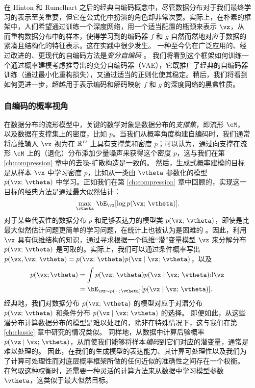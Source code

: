 \documentclass[../../book-main_zh.tex]{subfiles}
\begin{document}
在 Hinton 和 Rumelhart \cite{Rumelhart1986} 之后的经典自编码概念中，尽管数据分布对于我们最终学习的表示至关重要，但它在公式化中扮演的角色却非常次要。实际上，在朴素的框架中，人们希望通过训练一个深度网络，用一个适当配置的瓶颈来表示 $\vz$，从而重构数据分布中的样本，使得学习到的编码器 $f$ 和 $g$ 自然而然地对应于数据的紧凑且结构化的特征表示。这在实践中很少发生。
一种至今仍在广泛应用的、经过改进的、更现代的自编码方法是\textit{变分自编码} \cite{Kingma2013-sb,Kingma2019-zh}。
我们将看到这个框架如何训练一个通过概率建模考虑推导出的变分自编码器（VAE），它既推广了经典的自编码器训练（通过最小化重构损失），又通过适当的正则化使其稳定。稍后，我们将看到如何更进一步，超越用于表示编码和解码映射 $f$ 和 $g$ 的深度网络的黑盒性质。

\subsubsection{自编码的概率视角}
在数据分布的流形模型中，关键的数学对象是数据分布的\textit{支撑集}，即流形 $\cM$，以及数据在支撑集上的密度，比如 $p$。当我们从概率角度构建自编码时，我们通常将高维输入 $\vx$ 视为在 $\mathbb{R}^D$ 上具有支撑集和密度 $p$；可以认为，通过向支撑在流形 $\cM$ 上的（退化）分布添加少量噪声来获得这个密度 $p$，这与我们在第 \ref{ch:compression} 章中的去噪-扩散构造是一致的。
然后，生成式概率建模的目标是从样本 $\vx$ 中学习密度 $p$，比如从一类由 $\vtheta$ 参数化的模型 $p(\vx;\, \vtheta)$ 中学习。正如我们在第 \ref{ch:compression} 章中回顾的，实现这一目标的经典方法是通过最大似然估计：
\begin{equation*}\label{eq:VAE-MLE}
\max_{\vtheta}\, \bE_{\vx}[ \log p(\vx;\, \vtheta) ].
\end{equation*}
对于某些代表性的数据分布 $p$ %
和足够表达力的模型类 $p(\vx;\, \vtheta)$，即使是比最大似然估计问题更简单的学习问题，在统计上也被认为是困难的 \cite{Yang1999-wb}。因此，利用 $\vx$ 具有低维结构的知识，通过寻求根据一个低维“潜”变量模型 $\vz$ 来分解分布 $p(\vx ;\, \vtheta)$ 是可取的。实际上，我们可以通过条件概率写出 $p(\vx, \vz ;\, \vtheta)
= p(\vz;\, \vtheta) p(\vx \mid \vz;\, \vtheta)$，以及
\begin{align*}
p(\vx; \vtheta) &= \int p(\vz;\, \vtheta) p(\vx \mid \vz;\, \vtheta) \odif \vz
\\
&=
\bE_{\vz \sim p(\,\cdot\,;\, \vtheta)}[ p(\vx \mid \vz;\, \vtheta) ].
\end{align*}
经典地，我们对数据分布 $p(\vx;\, \vtheta)$ 的模型对应于对潜分布 $p(\vz;\, \vtheta)$ 和条件分布 $p(\vx \mid \vz;\, \vtheta)$ 的选择。
即便如此，从这些潜分布计算数据分布的模型是难以处理的，除非在特殊情况下，这与我们在第 \ref{ch:classic} 章中研究的情况类似。
同样地，从数据中计算后验概率 $p(\vz \mid \vx;\, \vtheta)$，从而使我们能够将样本\textit{编码}到它们对应的潜变量，通常是难以处理的。
因此，在我们的生成模型的表达能力、其计算可处理性以及我们为了计算可处理性而对底层概率框架所做的任何近似的准确性之间存在一个权衡。
在驾驭这种权衡时，还需要一种灵活的计算方法来从数据中学习模型参数 $\vtheta$，这类似于最大似然目标。
\end{document}
